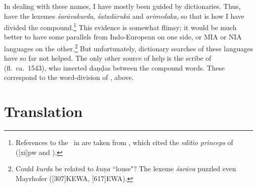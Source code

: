     In dealing with these names, I have mostly been guided by
dictionaries. Thus, \citet{moni-sans} have the lexemes
\emph{śarāvakurda}, \emph{śatadārukā} and \emph{arimedaka}, so
that is how I have divided the compound.\footnote{References to the \SS\ in 
\citet{moni-sans} are taken from \cite{pw}, which cited the \emph{editio 
princeps} of 
\citet{gupt-1835} ([xi]{pw} and \cite[149--150]{gild-1847}).}  
This evidence is
somewhat flimsy; it would be much better to have some parallels
from Indo-European on one side, or MIA or NIA languages on the
other.\footnote{Could \emph{kurda} be related to \emph{kuṇa}
    “louse"? The lexeme \emph{śarāva} puzzled even Mayrhofer 
    ([307]{KEWA}, 
    [617]{EWA}).}  But unfortunately, dictionary searches of these
    languages have so far not helped.  The only other source of help is
    the scribe of  (fl.\ ca.\ 1543), who
    inserted daṇḍas between the compound words.  These correspond to
    the word-division of \citet{moni-sans}, above.
        
\newpage
\section{Translation}

